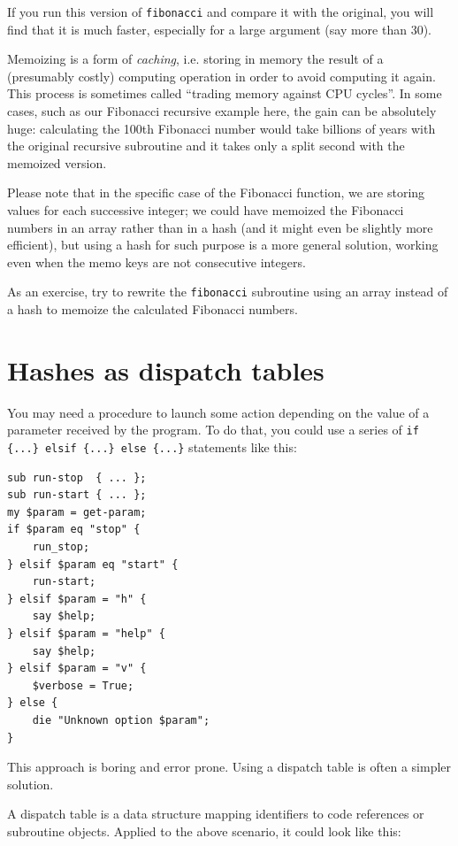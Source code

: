 If you run this version of {\tt fibonacci} and compare it with
the original, you will find that it is much faster, especially 
for a large argument (say more than 30).

Memoizing is a form of \emph{caching}, i.e. storing in memory 
the result of a (presumably costly) computing operation in 
order to avoid computing it again. This process is 
sometimes called ``trading memory against CPU cycles''.  In 
some cases, such as our Fibonacci recursive example here, the gain 
can be absolutely huge: calculating the 100th Fibonacci 
number would take billions of years with the original recursive 
subroutine and it takes only a split second with the memoized 
version.

Please note that in the specific case of the Fibonacci function, 
we are storing values for each successive integer; we could 
have memoized the Fibonacci numbers in an array rather than 
in a hash (and it might even be slightly more efficient), but 
using a hash for such purpose is a more general solution, 
working even when the memo keys are not consecutive integers.

As an exercise, try to rewrite the {\tt fibonacci} subroutine 
using an array instead of a hash to memoize the calculated 
Fibonacci numbers.


\section{Hashes as dispatch tables}
\label{dispatch}

You may 
need a procedure to launch some action depending on the 
value of a parameter received by the program. To do that, 
you could use a series of 
\verb'if {...} elsif {...} else {...}' 
statements like this:

\begin{verbatim}
sub run-stop  { ... };
sub run-start { ... };
my $param = get-param;
if $param eq "stop" {
    run_stop;
} elsif $param eq "start" {
    run-start;
} elsif $param = "h" {
    say $help;
} elsif $param = "help" {
    say $help;
} elsif $param = "v" {
    $verbose = True;
} else {
    die "Unknown option $param";
}
\end{verbatim}

This approach is boring and error prone. Using a dispatch table 
is often a simpler solution.

A dispatch table is a data structure mapping identifiers to 
code references or subroutine objects. Applied to the 
above scenario, it could look like this:

